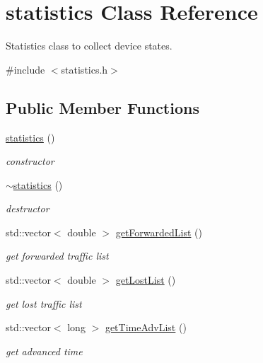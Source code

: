 \hypertarget{classstatistics}{
\section{statistics Class Reference}
\label{classstatistics}
}


Statistics class to collect device states.  




{\ttfamily \#include $<$statistics.h$>$}

\subsection*{Public Member Functions}
\begin{DoxyCompactItemize}
\item 
\hyperlink{classstatistics_a31d6750c3251c979f5c2d013984e1162}{statistics} ()
\begin{DoxyCompactList}\small\item\em constructor \item\end{DoxyCompactList}\item 
\hyperlink{classstatistics_a8cf720227802726be118712dc6616f94}{$\sim$statistics} ()
\begin{DoxyCompactList}\small\item\em destructor \item\end{DoxyCompactList}\item 
std::vector$<$ double $>$ \hyperlink{classstatistics_ab2c51b1a4cc826a09473860faf565360}{getForwardedList} ()
\begin{DoxyCompactList}\small\item\em get forwarded traffic list \item\end{DoxyCompactList}\item 
std::vector$<$ double $>$ \hyperlink{classstatistics_a99795974e97556668c02c5005b2df895}{getLostList} ()
\begin{DoxyCompactList}\small\item\em get lost traffic list \item\end{DoxyCompactList}\item 
std::vector$<$ long $>$ \hyperlink{classstatistics_a857adb219cf897c105a9e0aceca4188a}{getTimeAdvList} ()
\begin{DoxyCompactList}\small\item\em get advanced time \item\end{DoxyCompactList}\item 

\end{DoxyCompactItemize}
